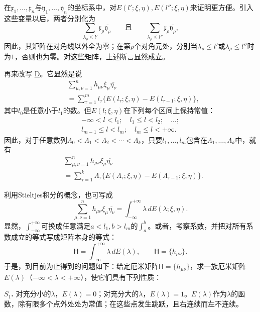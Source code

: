 \documentclass[fontsize=13pt,twoside,openany,headings=normal,parskip=false,bookmarkpackage=false,DIV=calc]{scrbook}
\begin{document}
在$\mathfrak{x}_1,\allowbreak \ldots,\allowbreak \mathfrak{x}_n$与$\mathfrak{y}_1,\allowbreak \ldots,\allowbreak \mathfrak{y}_n$的坐标系中，对$E(l';\xi,\allowbreak \eta),\allowbreak E(l'';\xi,\allowbreak \eta)$来证明更方便。引入这些变量以后，两者分别化为
\[
\sum_{\lambda_\rho\leq l'}\mathfrak{x}_\rho\overline{\mathfrak{y}_\rho}
\qquad\text{且}\qquad
\sum_{\lambda_\rho\leq l''}\mathfrak{x}_\rho\overline{\mathfrak{y}_\rho},
\]
因此，其矩阵在对角线以外全为零；在第$\rho$个对角元处，分别当$\lambda_\rho\leq l'$或$\lambda_\rho\leq l''$时为$1$，否则也为零。对这些矩阵，上述断言显然成立。

再来改写 \hyperref[eq:II.7.D]{D}。它显然是说
\begin{align*}
&\sum_{\mu,\nu=1}^n h_{\mu\nu}\xi_\mu\overline{\eta_\nu}\\
&=\sum_{\tau=1}^m l_\tau\{E(l_\tau;\xi,\eta)-E(l_{\tau-1};\xi,\eta)\},
\end{align*}
其中$l_0$是任意小于$l_1$的数。但$E(l;\xi,\allowbreak \eta)$在下列每个区间上保持常值：
\begin{gather*}
-\infty<l<l_1;\quad l_1\leq l<l_2;\quad\ldots;\\
 l_{m-1}\leq l<l_m;\quad l_m\leq l<+\infty.
\end{gather*}
因此，对于任意数列$\Lambda_0<\Lambda_1<\Lambda_2<\cdots<\Lambda_k$，只要$l_1,\allowbreak \ldots,\allowbreak l_m$包含在$\Lambda_1,\allowbreak \ldots,\allowbreak \Lambda_k$中，就有
\begin{align*}
&\sum_{\mu,\nu=1}^n h_{\mu\nu}\xi_\mu\overline{\eta_\nu}\\
&=\sum_{\tau=1}^k\Lambda_\tau\{E(\Lambda_\tau;\xi,\eta)-E(\Lambda_{\tau-1};\xi,\eta)\}.
\end{align*}

\hypertarget{origpage-59}{}\label{origpage-59}利用Stieltjes积分的概念，也可写成
\[
\sum_{\mu,\nu=1}^n h_{\mu\nu}\xi_\mu\overline{\eta_\nu}
=\int_{-\infty}^{+\infty}\lambda\,dE(\lambda;\xi,\eta).
\]
显然，$\int_{-\infty}^{+\infty}$可换成任意满足$a<l_1,\allowbreak b>l_m$的$\int_a^b$。或者，考察系数，并把对所有系数成立的等式写成矩阵本身的等式：
\[
\mathsf H=\int_{-\infty}^{+\infty}\lambda\,dE(\lambda),\qquad \mathsf H=\{h_{\mu\nu}\}.
\]
于是，到目前为止得到的问题如下：给定厄米矩阵$\mathsf H=\{h_{\mu\nu}\}$，求一族厄米矩阵$E(\lambda)$（$-\infty<\lambda<+\infty$），使它们具有下列性质：

\leavevmode{}\textbf{$S_1$.}\label{cond:II.S1} 对充分小的$\lambda$，$E(\lambda)=0$；对充分大的$\lambda$，$E(\lambda)=1$。$E(\lambda)$作为$\lambda$的函数，除有限多个点外处处为常值；在这些点发生跳跃，且右连续而左不连续。
\end{document}
